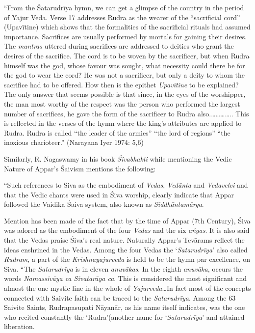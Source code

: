\begin{myquote}
“From the Śatarudrīya hymn, we can get a glimpse of the country in the period of Yajur Veda. Verse 17 addresses Rudra as the wearer of the “sacrificial cord” (Upavītine) which shows that the formalities of the sacrificial rituals had assumed importance. Sacrifices are usually performed by mortals for gaining their desires. The \textit{mantras} uttered during sacrifices are addressed to deities who grant the desires of the sacrifice. The cord is to be woven by the sacrificer, but when Rudra himself was the god, whose favour was sought, what necessity could there be for the god to wear the cord? He was not a sacrificer, but only a deity to whom the sacrifice had to be offered. How then is the epithet \textit{Upavītine} to be explained? The only answer that seems possible is that since, in the eyes of the worshipper, the man most worthy of the respect was the person who performed the largest number of sacrifices, he gave the form of the sacrificer to Rudra also.………….. This is reflected in the verses of the hymn where the king’s attributes are applied to Rudra. Rudra is called “the leader of the armies” “the lord of regions” “the inoxious charioteer.” (Narayana Iyer 1974: 5,6)
\end{myquote}

Similarly, R. Nagaswamy in his book \textit{Śivabhakti} while mentioning the Vedic Nature of Appar’s Śaivism mentions the following:

\begin{myquote}
“Such references to Siva as the embodiment of \textit{Vedas}, \textit{Vedānta} and \textit{Vedavelvi} and that the Vedic chants were used in Śiva worship, clearly indicate that Appar followed the Vaidika Śaiva system, also known as \textit{Siddhāntamārga}.
\end{myquote}

\begin{myquote}
Mention has been made of the fact that by the time of Appar (7th Century), Śiva was adored as the embodiment of the four \textit{Vedas} and the six \textit{ańgas}. It is also said that the Vedas praise Śiva’s real nature. Naturally Appar’s Tevārams reflect the ideas enshrined in the Vedas. Among the four Vedas the ‘\textit{Satarudrīya}’ also called \textit{Rudram}, a part of the \textit{Krishnayajurveda} is held to be the hymn par excellence, on Siva. “The \textit{Satarudrīya} is in eleven \textit{anuvākas}. In the eighth \textit{anuvāka}, occurs the words \textit{Namassivāya ca Sivatarāya ca}. This is considered the most significant and almost the one mystic line in the whole of \textit{Yajurveda}…In fact most of the concepts connected with Saivite faith can be traced to the \textit{Satarudrīya}. Among the 63 Saivite Saints, Rudrapasupati Nāyanār, as his name itself indicates, was the one who recited constantly the ‘Rudra’(another name for ‘\textit{Satarudrīya}’ and attained liberation.
\end{myquote}

